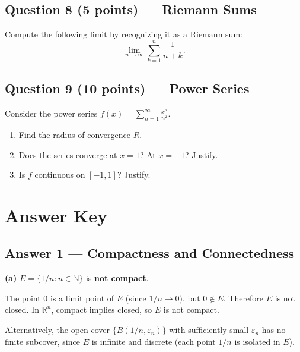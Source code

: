 \documentclass[10pt]{article}
\newcommand{\R}{\mathbb{R}}
\newcommand{\N}{\mathbb{N}}
\newcommand{\eps}{\varepsilon}
\begin{document}
\subsection{Question 8 \textnormal{(5 points)} --- Riemann Sums}

Compute the following limit by recognizing it as a Riemann sum:
$$
\lim_{n \to \infty} \sum_{k=1}^{n} \frac{1}{n+k}.
$$

\subsection{Question 9 \textnormal{(10 points)} --- Power Series}

Consider the power series $\displaystyle f(x) = \sum_{n=1}^{\infty} \frac{x^n}{n^2}$.

\begin{enumerate}[label=(\alph*)]
  \item Find the radius of convergence $R$.
  \item Does the series converge at $x = 1$? At $x = -1$? Justify.
  \item Is $f$ continuous on $[-1, 1]$? Justify.
\end{enumerate}

\newpage

\section{Answer Key}

\subsection{Answer 1 --- Compactness and Connectedness}

\textbf{(a)} $E = \{1/n : n \in \N\}$ is \textbf{not compact}.

The point $0$ is a limit point of $E$ (since $1/n \to 0$), but $0 \notin E$. Therefore $E$ is not closed. In $\R^n$, compact implies closed, so $E$ is not compact.

Alternatively, the open cover $\{B(1/n, \eps_n)\}$ with sufficiently small $\eps_n$ has no finite subcover, since $E$ is infinite and discrete (each point $1/n$ is isolated in $E$).
\end{document}
